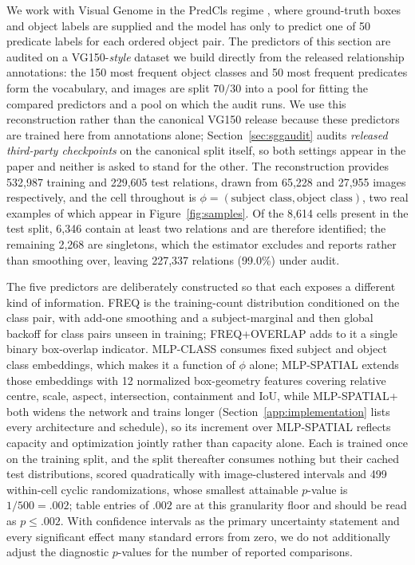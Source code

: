 We work with Visual Genome \cite{krishna2017visual} in the PredCls regime
\cite{xu2017scene}, where ground-truth boxes and object labels are supplied and
the model has only to predict one of 50 predicate labels for each ordered object pair.
The predictors of this section are audited on a VG150-\emph{style} dataset we build
directly from the released relationship annotations: the 150 most frequent object
classes and 50 most frequent predicates form the vocabulary, and images are split
$70/30$ into a pool for fitting the compared predictors and a pool on which the audit
runs. We use this reconstruction rather than the canonical VG150 release because these
predictors are trained here from annotations alone; Section~\ref{sec:sggaudit} audits
\emph{released third-party checkpoints} on the canonical split itself, so both settings
appear in the paper and neither is asked to stand for the other. The reconstruction
provides 532,987 training and 229,605 test relations, drawn from 65,228 and 27,955
images respectively, and the cell throughout is
$\phi=(\text{subject class},\text{object class})$, two real examples of which appear in
Figure~\ref{fig:samples}. Of the 8,614 cells present in the test split, 6,346 contain at
least two relations and are therefore identified; the remaining 2,268 are singletons,
which the estimator excludes and reports rather than smoothing over, leaving 227,337 relations
(99.0\%) under audit.

The five predictors are deliberately constructed so that each exposes a different kind
of information. FREQ is the training-count distribution conditioned on the class pair,
with add-one smoothing and a subject-marginal and then global backoff for class pairs
unseen in training; FREQ+OVERLAP adds to it a single binary box-overlap indicator.
MLP-CLASS consumes fixed subject and object class embeddings, which makes it a function
of $\phi$ alone; MLP-SPATIAL extends those embeddings with 12 normalized box-geometry
features covering relative centre, scale, aspect, intersection, containment and IoU,
while MLP-SPATIAL+ both widens the network and trains longer (Section~\ref{app:implementation} lists every architecture and schedule), so its increment over
MLP-SPATIAL reflects capacity and optimization jointly rather than capacity alone. Each
is trained once on the training split, and the split thereafter consumes nothing but their
cached test distributions, scored quadratically with image-clustered intervals and 499
within-cell cyclic randomizations, whose smallest attainable $p$-value is
$1/500=.002$; table entries of $.002$ are at this granularity floor and should be read
as $p\le.002$. With confidence intervals as the primary uncertainty statement and every
significant effect many standard errors from zero, we do not additionally adjust the
diagnostic $p$-values for the number of reported comparisons.

